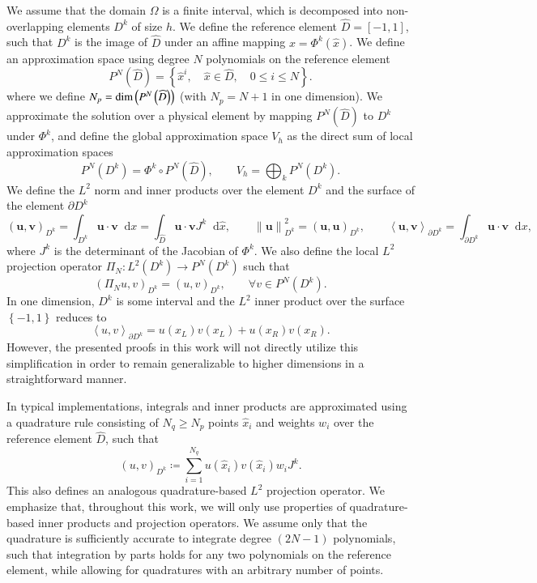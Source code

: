 \documentclass[preprint,10pt]{elsarticle}
\theoremstyle{definition}
\theoremstyle{lemma}
\theoremstyle{theorem}
\theoremstyle{assumption}
\newcommand{\nor}[1]{\left\| #1 \right\|}
\newcommand{\LRp}[1]{\left( #1 \right)}
\newcommand{\LRa}[1]{\left\langle #1 \right\rangle}
\newcommand{\LRc}[1]{\left\{ #1 \right\}}
\newcommand*\diff[1]{\mathop{}\!{\mathrm{d}#1}}
\begin{document}
We assume that the domain $\Omega$ is a finite interval, which is decomposed into non-overlapping elements $D^k$ of size $h$.  We define the reference element $\widehat{D} = [-1,1]$, such that $D^k$ is the image of $\widehat{D}$ under an affine mapping $x = \Phi^k(\widehat{x})$.  We define an approximation space using degree $N$ polynomials on the reference element
\[
P^N\LRp{\widehat{D}} = \LRc{\widehat{x}^i, \quad \widehat{x} \in \widehat{D}, \quad 0\leq i \leq N}.
\]
where we define $N_p = {\rm dim}\LRp{P^N\LRp{\widehat{D}}}$ (with $N_p = N+1$ in one dimension).  
We approximate the solution over a physical element by mapping $P^N\LRp{\widehat{D}}$ to $D^k$ under $\Phi^k$, and define the global approximation space $V_h$ as the direct sum of local approximation spaces
\[
P^N\LRp{D^k} =  {\Phi}^k \circ P^N\LRp{\widehat{D}}, \qquad V_h = \bigoplus_{k}P^N\LRp{D^k}.
\]
We define the $L^2$ norm and inner products over the element $D^k$ and the surface of the element $\partial D^k$
\[
\LRp{\bm{u},\bm{v}}_{D^k} = \int_{D^k} \bm{u}\cdot\bm{v}\diff{x} =  \int_{\widehat{D}} \bm{u}\cdot\bm{v} J^k \diff{\widehat{x}}, \qquad \nor{\bm{u}}^2_{D^k} = (\bm{u},\bm{u})_{D^k}, \qquad \LRa{\bm{u},\bm{v}}_{\partial D^k} = \int_{\partial D^k} \bm{u} \cdot \bm{v} \diff{x},
\]
where $J^k$ is the determinant of the Jacobian of $\Phi^k$.  
We also define the local $L^2$ projection operator $\Pi_N: L^2(D^k)\rightarrow P^N(D^k)$ such that
\[
\LRp{\Pi_N u,v}_{D^k} = \LRp{u,v}_{D^k}, \qquad \forall v\in P^N\LRp{D^k}.  
\]
In one dimension, $D^k$ is some interval and the $L^2$ inner product over the surface $\LRc{-1,1}$ reduces to 
\[
\LRa{u,v}_{\partial D^k} = u(x_L)v(x_L) + u(x_R)v(x_R).
\]  
However, the presented proofs in this work will not directly utilize this simplification in order to remain generalizable to higher dimensions in a straightforward manner.  

In typical implementations, integrals and inner products are  approximated using a quadrature rule consisting of $N_q \geq N_p$ points $\widehat{x}_i$ and weights $w_i$ over the reference element $\widehat{D}$, such that
\[
\LRp{u,v}_{D^k} \coloneqq \sum_{i=1}^{N_q} u(\widehat{x}_i)v(\widehat{x}_i)w_i J^k.     
\]
This also defines an analogous quadrature-based $L^2$ projection operator.  We emphasize that, throughout this work, we will only use properties of quadrature-based inner products and projection operators.  We assume only that the quadrature is sufficiently accurate to integrate degree $(2N-1)$ polynomials, such that integration by parts holds for any two polynomials on the reference element, while allowing for quadratures with an arbitrary number of points.  
\end{document}
